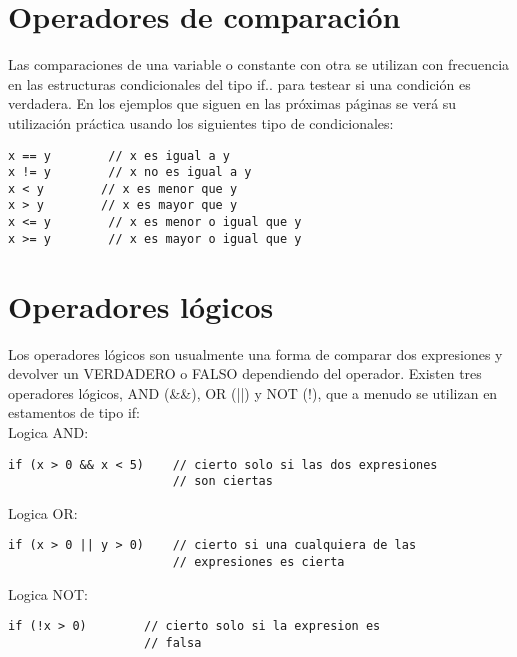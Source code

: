 \section{Operadores de comparación}

Las comparaciones de una variable o constante con otra se utilizan con frecuencia en las estructuras condicionales del tipo if.. para testear si una condición es verdadera. En los ejemplos que siguen en las próximas páginas se verá su utilización práctica usando los siguientes tipo de condicionales:
\begin{lstlisting}
x == y        // x es igual a y
x != y        // x no es igual a y
x < y        // x es menor que y
x > y        // x es mayor que y
x <= y        // x es menor o igual que y
x >= y        // x es mayor o igual que y
\end{lstlisting}
\newpage{}
\section{Operadores lógicos}

Los operadores lógicos son usualmente una forma de comparar dos expresiones y devolver un VERDADERO o FALSO dependiendo del operador. Existen tres operadores lógicos, AND (\&\&), OR (||) y NOT (!), que a menudo se utilizan en estamentos de tipo if:\\
Logica AND:\\
\begin{lstlisting}
if (x > 0 && x < 5)    // cierto solo si las dos expresiones
                       // son ciertas
\end{lstlisting}
Logica OR:\\
\begin{lstlisting}
if (x > 0 || y > 0)    // cierto si una cualquiera de las
                       // expresiones es cierta
\end{lstlisting}
Logica NOT:\\
\begin{lstlisting}
if (!x > 0)        // cierto solo si la expresion es
                   // falsa
\end{lstlisting}